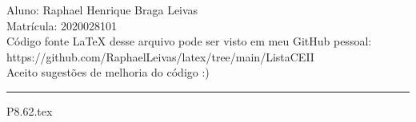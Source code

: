 \documentclass[12pt]{scrartcl}
\begin{document}
\pagestyle{fancy}

\fancyhead{}
\fancyfoot{}

\begin{center}
    Aluno: Raphael Henrique Braga Leivas \\
    Matrícula: 2020028101 \\[20pt]
    Código fonte LaTeX desse arquivo pode ser visto em meu GitHub pessoal: \\
    https://github.com/RaphaelLeivas/latex/tree/main/ListaCEII \\[10pt]
    Aceito sugestões de melhoria do código :)
\end{center}

\hrule

{P8.62.tex}



\end{document}
